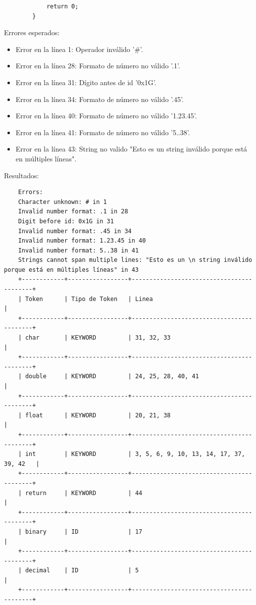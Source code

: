 \documentclass[a4paper,12pt]{article}
\begin{document}
\begin{flushleft}
\begin{verbatim}
			return 0;
		}
	\end{verbatim}
	Errores esperados:
	\begin{itemize}
		\item Error en la línea 1: Operador inválido '\#'.
		\item Error en la línea 28: Formato de número no válido '.1'.
		\item Error en la línea 31: Dígito antes de id '0x1G'.
		\item Error en la línea 34: Formato de número no válido '.45'.
		\item Error en la línea 40: Formato de número no válido '1.23.45'.
		\item Error en la línea 41: Formato de número no válido '5..38'.
		\item Error en la línea 43: String no valido "Esto es un string inválido porque está en múltiples líneas".
	\end{itemize}
	Resultados:
	\begin{verbatim}
	Errors: 
	Character unknown: # in 1
	Invalid number format: .1 in 28
	Digit before id: 0x1G in 31
	Invalid number format: .45 in 34
	Invalid number format: 1.23.45 in 40
	Invalid number format: 5..38 in 41
	Strings cannot span multiple lines: "Esto es un \n string inválido porque está en múltiples líneas" in 43
	+------------+-----------------+------------------------------------------+
	| Token      | Tipo de Token   | Linea                                    |
	+------------+-----------------+------------------------------------------+
	| char       | KEYWORD         | 31, 32, 33                               |
	+------------+-----------------+------------------------------------------+
	| double     | KEYWORD         | 24, 25, 28, 40, 41                       |
	+------------+-----------------+------------------------------------------+
	| float      | KEYWORD         | 20, 21, 38                               |
	+------------+-----------------+------------------------------------------+
	| int        | KEYWORD         | 3, 5, 6, 9, 10, 13, 14, 17, 37, 39, 42   |
	+------------+-----------------+------------------------------------------+
	| return     | KEYWORD         | 44                                       |
	+------------+-----------------+------------------------------------------+
	| binary     | ID              | 17                                       |
	+------------+-----------------+------------------------------------------+
	| decimal    | ID              | 5                                        |
	+------------+-----------------+------------------------------------------+

\end{verbatim}
\end{flushleft}
\end{document}
